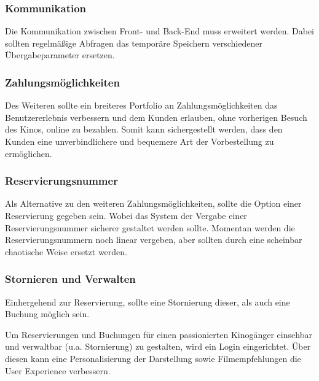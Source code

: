\subsubsection*{Kommunikation}
\label{ssssec:kommunikation}
Die Kommunikation zwischen Front- und Back-End muss erweitert werden.
Dabei sollten regelmäßige Abfragen das temporäre Speichern verschiedener Übergabeparameter ersetzen.

\subsubsection*{Zahlungsmöglichkeiten}
\label{ssssec:zahlungsmöglichkeiten}
Des Weiteren sollte ein breiteres Portfolio an Zahlungsmöglichkeiten das Benutzererlebnis verbessern und dem Kunden erlauben, ohne vorherigen Besuch des Kinos, online zu bezahlen.
Somit kann sichergestellt werden, dass den Kunden eine unverbindlichere und bequemere Art der Vorbestellung zu ermöglichen.

\subsubsection*{Reservierungsnummer}
\label{ssssec:reservierungsnummer}
Als Alternative zu den weiteren Zahlungsmöglichkeiten, sollte die Option einer Reservierung gegeben sein.
Wobei das System der Vergabe einer Reservierungsnummer sicherer gestaltet werden sollte.
Momentan werden die Reservierungsnummern noch linear vergeben, aber sollten durch eine scheinbar chaotische Weise ersetzt werden.

\subsubsection*{Stornieren und Verwalten}
\label{ssssec:stornieren_und_verwalten}
Einhergehend zur Reservierung, sollte eine Stornierung dieser, als auch eine Buchung möglich sein.

Um Reservierungen und Buchungen für einen passionierten Kinogänger einsehbar und verwaltbar (u.a. Stornierung) zu gestalten, wird ein Login eingerichtet.
Über diesen kann eine Personalisierung der Darstellung sowie Filmempfehlungen die User Experience verbessern.



